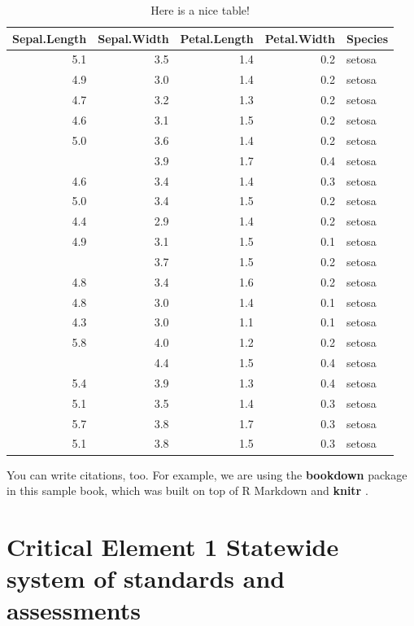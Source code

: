 \documentclass[]{book}
\begin{document}
\begin{table}

\caption{\label{tab:nice-tab}Here is a nice table!}
\centering
\begin{tabular}[t]{rrrrl}
\toprule
Sepal.Length & Sepal.Width & Petal.Length & Petal.Width & Species\\
\midrule
5.1 & 3.5 & 1.4 & 0.2 & setosa\\
4.9 & 3.0 & 1.4 & 0.2 & setosa\\
4.7 & 3.2 & 1.3 & 0.2 & setosa\\
4.6 & 3.1 & 1.5 & 0.2 & setosa\\
5.0 & 3.6 & 1.4 & 0.2 & setosa\\
\addlinespace
5.4 & 3.9 & 1.7 & 0.4 & setosa\\
4.6 & 3.4 & 1.4 & 0.3 & setosa\\
5.0 & 3.4 & 1.5 & 0.2 & setosa\\
4.4 & 2.9 & 1.4 & 0.2 & setosa\\
4.9 & 3.1 & 1.5 & 0.1 & setosa\\
\addlinespace
5.4 & 3.7 & 1.5 & 0.2 & setosa\\
4.8 & 3.4 & 1.6 & 0.2 & setosa\\
4.8 & 3.0 & 1.4 & 0.1 & setosa\\
4.3 & 3.0 & 1.1 & 0.1 & setosa\\
5.8 & 4.0 & 1.2 & 0.2 & setosa\\
\addlinespace
5.7 & 4.4 & 1.5 & 0.4 & setosa\\
5.4 & 3.9 & 1.3 & 0.4 & setosa\\
5.1 & 3.5 & 1.4 & 0.3 & setosa\\
5.7 & 3.8 & 1.7 & 0.3 & setosa\\
5.1 & 3.8 & 1.5 & 0.3 & setosa\\
\bottomrule
\end{tabular}
\end{table}

You can write citations, too. For example, we are using the \textbf{bookdown} package \citep{R-bookdown} in this sample book, which was built on top of R Markdown and \textbf{knitr} \citep{xie2015}.

\hypertarget{critical-element-1-statewide-system-of-standards-and-assessments}{%
\chapter{Critical Element 1 Statewide system of standards and assessments}\label{critical-element-1-statewide-system-of-standards-and-assessments}}
\end{document}
